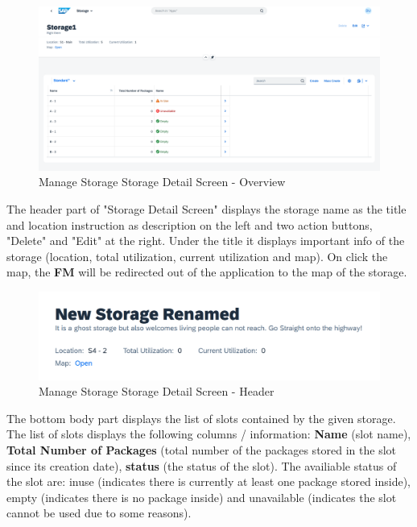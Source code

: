 \begin{figure}[H]
	\centering
	\includegraphics[width=1\linewidth]{images/user_doc/storage/StorageReportPage/storageObjWithSlots.png}
	\caption{Manage Storage Storage Detail Screen - Overview}
	\label{fig:MSdetailOVerview}
\end{figure}

The header part of "Storage Detail Screen" displays the storage name as the title and location instruction as description on the left and two action buttons, "Delete" and "Edit" at the right.
Under the title it displays important info of the storage (location, total utilization, current utilization and map). On click the map, the \textbf{FM} will be redirected out of the application to the map of the storage.

\begin{figure}[H] %
	\centering
	\includegraphics[width=1\linewidth]{images/user_doc/storage/StorageObjectPage/StorageObjHeader.png}
	\caption{Manage Storage Storage Detail Screen - Header}
	\label{fig:MSstorageObjHeader}
\end{figure}

The bottom body part displays the list of slots contained by the given storage. The list of slots displays the following columns / information: \textbf{Name} (slot name), \textbf{Total Number of Packages} (total number of the packages stored in the slot since its creation date), \textbf{status} (the status of the slot). The availiable status of the slot are: inuse (indicates there is currently at least one package stored inside), empty (indicates there is no package inside) and unavailable (indicates the slot cannot be used due to some reasons).

